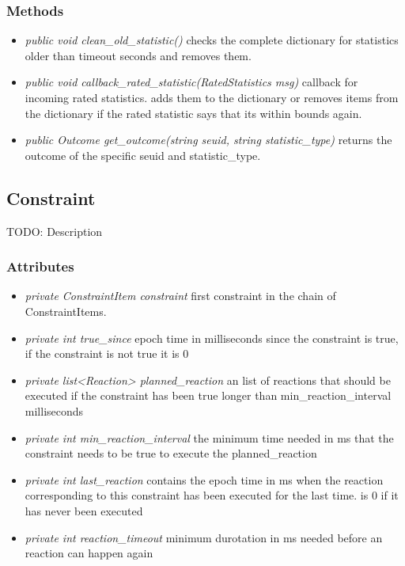 \subsubsection{Methods}
\begin{itemize}
	\item \textit{ public void clean\_old\_statistic() }
		checks the complete dictionary for statistics older than timeout seconds and removes them.
	\item \textit{ public void callback\_rated\_statistic(RatedStatistics msg) }
		callback for incoming rated statistics. adds them to the dictionary or removes items from the dictionary if the rated statistic says that its within bounds again. 
	\item \textit{ public Outcome get\_outcome(string seuid, string statistic\_type) }
		returns the outcome of the specific seuid and statistic\_type.
\end{itemize}

\subsection{Constraint }
TODO: Description


\subsubsection{Attributes}
\begin{itemize}
	\item \textit{ private ConstraintItem constraint }
	first constraint in the chain of ConstraintItems.
	\item \textit{ private int true\_since }
	epoch time in milliseconds since the constraint is true,
	if the constraint is not true it is 0
	\item \textit{ private list<Reaction> planned\_reaction }
	an list of reactions that should be executed if the constraint has been true longer than min\_reaction\_interval milliseconds
	\item \textit{ private int min\_reaction\_interval }
	the minimum time needed in ms that the constraint needs to be true to execute the planned\_reaction
	\item \textit{ private int last\_reaction }
	contains the epoch time in ms when the reaction corresponding to this constraint has been executed for the last time.
		is 0 if it has never been executed
	\item \textit{ private int reaction\_timeout }
	minimum durotation in ms needed before an reaction can happen again
\end{itemize}
